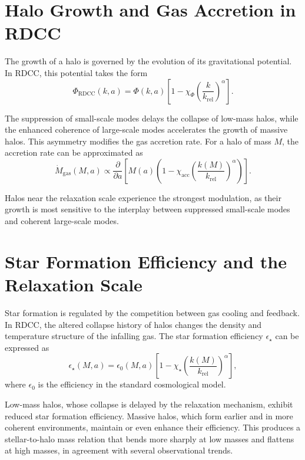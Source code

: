 \documentclass[11pt,a4paper]{article}
\begin{document}
\section{Halo Growth and Gas Accretion in RDCC}

The growth of a halo is governed by the evolution of its gravitational potential. 
In RDCC, this potential takes the form
\begin{equation}
    \Phi_{\mathrm{RDCC}}(k,a)
    = \Phi(k,a)
      \left[1 - \chi_{\Phi}
      \left(\frac{k}{k_{\mathrm{rel}}}\right)^{\alpha}\right].
\end{equation}

The suppression of small-scale modes delays the collapse of low-mass halos, while 
the enhanced coherence of large-scale modes accelerates the growth of massive halos. 
This asymmetry modifies the gas accretion rate. For a halo of mass $M$, the 
accretion rate can be approximated as
\begin{equation}
    \dot{M}_{\mathrm{gas}}(M,a)
    \propto \frac{\partial}{\partial a}
    \left[
        M(a)
        \left(
            1 - \chi_{\mathrm{acc}}
            \left(\frac{k(M)}{k_{\mathrm{rel}}}\right)^{\alpha}
        \right)
    \right].
\end{equation}

Halos near the relaxation scale experience the strongest modulation, as their 
growth is most sensitive to the interplay between suppressed small-scale modes 
and coherent large-scale modes.
\section{Star Formation Efficiency and the Relaxation Scale}

Star formation is regulated by the competition between gas cooling and feedback. 
In RDCC, the altered collapse history of halos changes the density and temperature 
structure of the infalling gas. The star formation efficiency $\epsilon_{\star}$ 
can be expressed as
\begin{equation}
    \epsilon_{\star}(M,a)
    = \epsilon_{0}(M,a)
      \left[
        1 - \chi_{\star}
        \left(\frac{k(M)}{k_{\mathrm{rel}}}\right)^{\alpha}
      \right],
\end{equation}
where $\epsilon_{0}$ is the efficiency in the standard cosmological model.

Low-mass halos, whose collapse is delayed by the relaxation mechanism, exhibit 
reduced star formation efficiency. Massive halos, which form earlier and in more 
coherent environments, maintain or even enhance their efficiency. This produces a 
stellar-to-halo mass relation that bends more sharply at low masses and flattens 
at high masses, in agreement with several observational trends.
\end{document}
